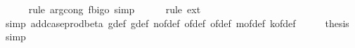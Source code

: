 \begin{isabellebody}
\ \ \ \ \isamarkupfalse%
\ {\isacharparenleft}{\kern0pt}rule\ arg{\isacharunderscore}{\kern0pt}cong{}{\isacharbrackleft}{\kern0pt}\ f{\isacharequal}{\kern0pt}{\isachardoublequoteopen}bigo{\isachardoublequoteclose}{\isacharbrackright}{\kern0pt}{\isacharcomma}{\kern0pt}\ simp{\isacharparenright}{\kern0pt}\isanewline
\ \ \ \ \isamarkupfalse%
\ {\isacharparenleft}{\kern0pt}rule\ ext{\isacharparenright}{\kern0pt}\isanewline
\ \ \ \ \isamarkupfalse%
\ {\isacharparenleft}{\kern0pt}simp\ add{\isacharcolon}{\kern0pt}case{\isacharunderscore}{\kern0pt}prod{\isacharunderscore}{\kern0pt}beta{\isacharprime}{\kern0pt}\ g{}{\isacharunderscore}{\kern0pt}def\ g{\isacharunderscore}{\kern0pt}def\ n{\isacharunderscore}{\kern0pt}of{\isacharunderscore}{\kern0pt}def\ {\isasymepsilon}{\isacharunderscore}{\kern0pt}of{\isacharunderscore}{\kern0pt}def\ {\isasymdelta}{\isacharunderscore}{\kern0pt}of{\isacharunderscore}{\kern0pt}def\ m{\isacharunderscore}{\kern0pt}of{\isacharunderscore}{\kern0pt}def\ k{\isacharunderscore}{\kern0pt}of{\isacharunderscore}{\kern0pt}def{\isacharparenright}{\kern0pt}\isanewline
\ \ \isamarkupfalse%
\ \isamarkupfalse%
\ {\isacharquery}{\kern0pt}thesis\ \isamarkupfalse%
\ simp\isanewline
{}\isamarkupfalse%
%
\endisatagproof
{\isafoldproof}%
%
\isadelimproof
\isanewline
%
\endisadelimproof
%
\isadelimtheory
\isanewline
%
\endisadelimtheory
%
\isatagtheory
{}\isamarkupfalse%
%
\endisatagtheory
{\isafoldtheory}%
%
\isadelimtheory
%
\endisadelimtheory
%
\end{isabellebody}%
\endinput
